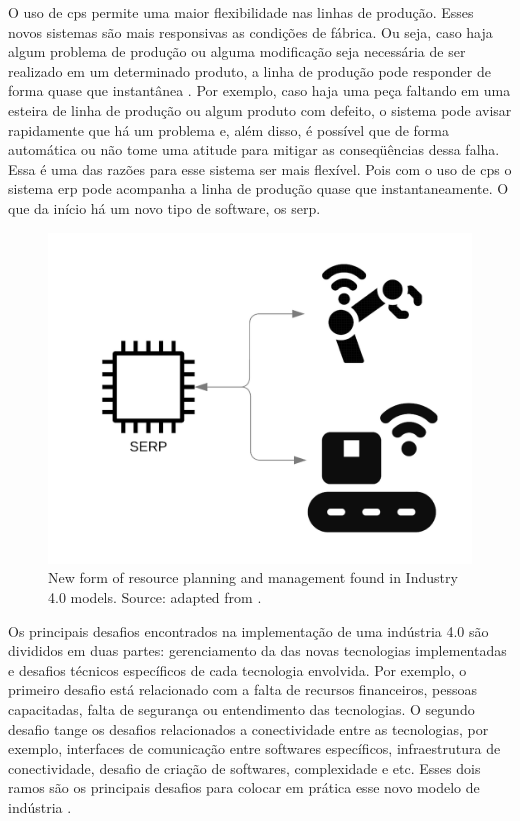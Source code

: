 O uso de \acrshort{cps} permite uma maior flexibilidade nas linhas de produção. Esses novos sistemas são mais responsivas as condições de fábrica. Ou seja, caso haja algum problema de produção ou alguma modificação seja necessária de ser realizado em um determinado produto, a linha de produção pode responder de forma quase que instantânea \cite{Gilchrist2016}. Por exemplo, caso haja uma peça faltando em uma esteira de linha de produção ou algum produto com defeito, o sistema pode avisar rapidamente que há um problema e, além disso, é possível que de forma automática ou não tome uma atitude para mitigar as conseqüências dessa falha. Essa é uma das razões para esse sistema ser mais flexível. Pois com o uso de \acrshort{cps} o sistema \acrshort{erp} pode acompanha a linha de produção quase que instantaneamente. O que da início há um novo tipo de software, os \acrfull{serp}.

\begin{figure}[h!]
    \centering
    \includegraphics[scale=0.2]{images/Related/SERP.png}
    \caption{New form of resource planning and management found in Industry 4.0 models. Source: adapted from \cite{Gilchrist2016}.}

    \label{fig:serp}
\end{figure}

Os principais desafios encontrados na implementação de uma indústria 4.0 são divididos em duas partes: gerenciamento da  das novas tecnologias implementadas e desafios técnicos específicos de cada tecnologia envolvida. Por exemplo, o primeiro desafio está relacionado com a falta de recursos financeiros, pessoas capacitadas, falta de segurança ou entendimento das tecnologias. O segundo desafio tange os desafios relacionados a conectividade entre as tecnologias, por exemplo, interfaces de comunicação entre softwares específicos, infraestrutura de conectividade, desafio de criação de softwares, complexidade e etc. Esses dois ramos são os principais desafios para colocar em prática esse novo modelo de indústria \cite{Rikalovic2022}.

